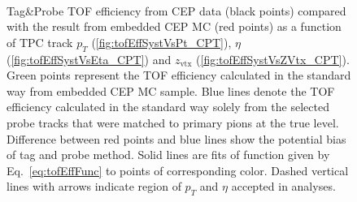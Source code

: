 \begin{figure}[h!]
{\begin{subfigure}[b]{\linewidth}
  \end{subfigure}  
}
\quad
\parbox{0.4725\textwidth}{
  \centering\vspace*{-55pt}
    \begin{subfigure}[b]{\linewidth}
  \end{subfigure}\\[5pt]
		\begin{minipage}[t][0.78\linewidth][t]{\linewidth}\vspace{10pt}
			\caption[Tag\&Probe TOF efficiency from CEP data compared with the result from embedded CEP MC.]%
    {Tag\&Probe TOF efficiency from CEP data (black points) compared with the result from embedded CEP MC (red points) as a function of TPC track $p_{T}$ (\ref{fig:tofEffSystVsPt_CPT}), $\eta$ (\ref{fig:tofEffSystVsEta_CPT}) and $z_{\text{vtx}}$ (\ref{fig:tofEffSystVsZVtx_CPT}). Green points represent the TOF efficiency calculated in the standard way from embedded CEP MC sample. Blue lines denote the TOF efficiency calculated in the standard way solely from the selected probe tracks that were matched to primary pions at the true level. Difference between red points and blue lines show the potential bias of tag and probe method. Solid lines are fits of function given by Eq.~\eqref{eq:tofEffFunc} to points of corresponding color. Dashed vertical lines with arrows indicate region of $p_{T}$ and $\eta$ accepted in analyses.}\label{fig:tofEffSyst}%
		\end{minipage}
} \vspace{-5pt}%
\end{figure}



